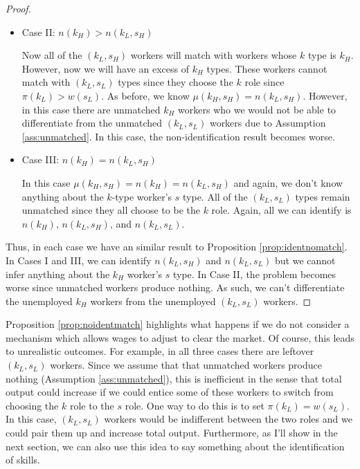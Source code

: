 \documentclass[12 pt]{article}
\begin{document}
\begin{proof}
\begin{itemize}
		\item Case II: $n(k_H) > n(k_L,s_H)$
		
		Now all of the $(k_L,s_H)$ workers will match with workers whose $k$ type is $k_H$. However, now we will have an excess of $k_H$ types. These workers cannot match with $(k_L,s_L)$ types since they choose the $k$ role since $\pi(k_L)>w(s_L)$. As before, we know $\mu(k_H,s_H)=n(k_L,s_H)$. However, in this case there are unmatched $k_H$ workers who we would  not be able to differentiate from the unmatched $(k_L,s_L)$ workers due to Assumption \ref{ass:unmatched}. In this case, the non-identification result becomes worse.
		
		\item Case III: $n(k_H) = n(k_L,s_H)$
		
		In this case $\mu(k_H,s_H) = n(k_H) = n(k_L,s_H)$ and again, we don't know anything about the $k$-type worker's $s$ type. All of the $(k_L,s_L)$ types remain unmatched since they all choose to be the $k$ role. Again, all we can identify is $n(k_H)$, $n(k_L,s_H)$, and $n(k_L,s_L)$.
	\end{itemize}
	
	Thus, in each case we have an similar result to Proposition \ref{prop:identnomatch}. In Cases I and III, we can identify $n(k_L,s_H)$ and $n(k_L,s_L)$ but we cannot infer anything about the $k_H$ worker's $s$ type. In Case II, the problem becomes worse since unmatched workers produce nothing. As such, we can't differentiate the unemployed $k_H$ workers from the unemployed $(k_L,s_L)$ workers.
	
\end{proof}

Proposition \ref{prop:noidentmatch} highlights what happens if we do not consider a mechanism which allows wages to adjust to clear the market. Of course, this leads to unrealistic outcomes. For example, in all three cases there are leftover $(k_L,s_L)$ workers. Since we assume that that unmatched workers produce nothing (Assumption \ref{ass:unmatched}), this is inefficient in the sense that total output could increase if we could entice some of these workers to switch from choosing the $k$ role to the $s$ role. One way to do this is to set $\pi(k_L) = w(s_L)$. In this case, $(k_L,s_L)$ workers would be indifferent between the two roles and we could pair them up and increase total output. Furthermore, as I'll show in the next section, we can also use this idea to say something about the identification of skills. 
\end{document}
